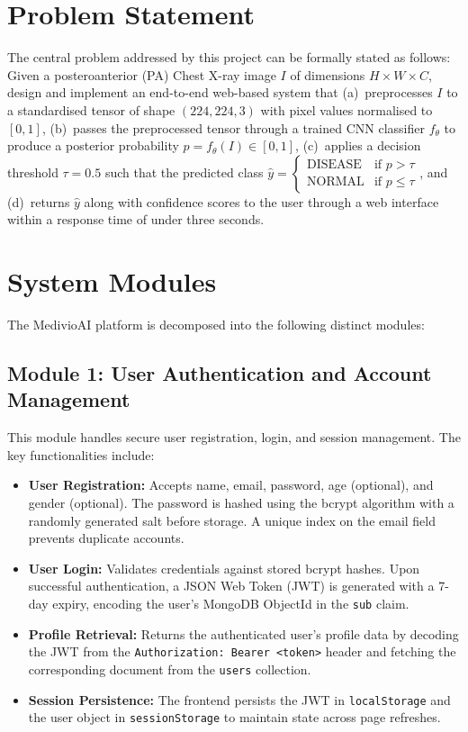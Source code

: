\documentclass[12pt, a4paper, oneside]{report}
\begin{document}
\section{Problem Statement}
\label{sec:problem_statement}

The central problem addressed by this project can be formally stated as follows: Given a posteroanterior (PA) Chest X-ray image $I$ of dimensions $H \times W \times C$, design and implement an end-to-end web-based system that (a)~preprocesses $I$ to a standardised tensor of shape $(224, 224, 3)$ with pixel values normalised to $[0, 1]$, (b)~passes the preprocessed tensor through a trained CNN classifier $f_\theta$ to produce a posterior probability $p = f_\theta(I) \in [0, 1]$, (c)~applies a decision threshold $\tau = 0.5$ such that the predicted class $\hat{y} = \begin{cases} \text{DISEASE} & \text{if } p > \tau \\ \text{NORMAL} & \text{if } p \leq \tau \end{cases}$, and (d)~returns $\hat{y}$ along with confidence scores to the user through a web interface within a response time of under three seconds.

\section{System Modules}
\label{sec:modules}

The MedivioAI platform is decomposed into the following distinct modules:

\subsection{Module 1: User Authentication and Account Management}
\label{subsec:mod_auth}

This module handles secure user registration, login, and session management. The key functionalities include:

\begin{itemize}
    \item \textbf{User Registration:} Accepts name, email, password, age (optional), and gender (optional). The password is hashed using the bcrypt algorithm with a randomly generated salt before storage. A unique index on the email field prevents duplicate accounts.
    \item \textbf{User Login:} Validates credentials against stored bcrypt hashes. Upon successful authentication, a JSON Web Token (JWT) is generated with a 7-day expiry, encoding the user's MongoDB ObjectId in the \texttt{sub} claim.
    \item \textbf{Profile Retrieval:} Returns the authenticated user's profile data by decoding the JWT from the \texttt{Authorization: Bearer <token>} header and fetching the corresponding document from the \texttt{users} collection.
    \item \textbf{Session Persistence:} The frontend persists the JWT in \texttt{localStorage} and the user object in \texttt{sessionStorage} to maintain state across page refreshes.
\end{itemize}
\end{document}
